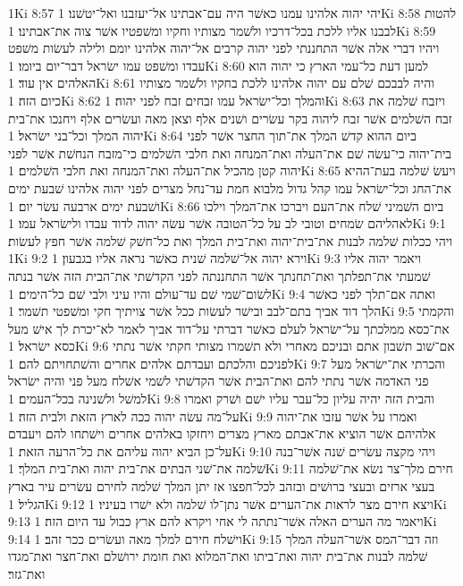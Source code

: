1Ki 8:57  יהי יהוה אלהינו עמנו כאשׁר היה עם־אבתינו אל־יעזבנו ואל־יטשׁנו׃
1Ki 8:58  להטות לבבנו אליו ללכת בכל־דרכיו ולשׁמר מצותיו וחקיו ומשׁפטיו אשׁר צוה את־אבתינו׃
1Ki 8:59  ויהיו דברי אלה אשׁר התחננתי לפני יהוה קרבים אל־יהוה אלהינו יומם ולילה לעשׂות משׁפט עבדו ומשׁפט עמו ישׂראל דבר־יום ביומו׃
1Ki 8:60  למען דעת כל־עמי הארץ כי יהוה הוא האלהים אין עוד׃
1Ki 8:61  והיה לבבכם שׁלם עם יהוה אלהינו ללכת בחקיו ולשׁמר מצותיו כיום הזה׃
1Ki 8:62  והמלך וכל־ישׂראל עמו זבחים זבח לפני יהוה׃
1Ki 8:63  ויזבח שׁלמה את זבח השׁלמים אשׁר זבח ליהוה בקר עשׂרים ושׁנים אלף וצאן מאה ועשׂרים אלף ויחנכו את־בית יהוה המלך וכל־בני ישׂראל׃
1Ki 8:64  ביום ההוא קדשׁ המלך את־תוך החצר אשׁר לפני בית־יהוה כי־עשׂה שׁם את־העלה ואת־המנחה ואת חלבי השׁלמים כי־מזבח הנחשׁת אשׁר לפני יהוה קטן מהכיל את־העלה ואת־המנחה ואת חלבי השׁלמים׃
1Ki 8:65  ויעשׂ שׁלמה בעת־ההיא את־החג וכל־ישׂראל עמו קהל גדול מלבוא חמת עד־נחל מצרים לפני יהוה אלהינו שׁבעת ימים ושׁבעת ימים ארבעה עשׂר יום׃
1Ki 8:66  ביום השׁמיני שׁלח את־העם ויברכו את־המלך וילכו לאהליהם שׂמחים וטובי לב על כל־הטובה אשׁר עשׂה יהוה לדוד עבדו ולישׂראל עמו׃
1Ki 9:1  ויהי ככלות שׁלמה לבנות את־בית־יהוה ואת־בית המלך ואת כל־חשׁק שׁלמה אשׁר חפץ לעשׂות׃
1Ki 9:2  וירא יהוה אל־שׁלמה שׁנית כאשׁר נראה אליו בגבעון׃
1Ki 9:3  ויאמר יהוה אליו שׁמעתי את־תפלתך ואת־תחנתך אשׁר התחננתה לפני הקדשׁתי את־הבית הזה אשׁר בנתה לשׂום־שׁמי שׁם עד־עולם והיו עיני ולבי שׁם כל־הימים׃
1Ki 9:4  ואתה אם־תלך לפני כאשׁר הלך דוד אביך בתם־לבב ובישׁר לעשׂות ככל אשׁר צויתיך חקי ומשׁפטי תשׁמר׃
1Ki 9:5  והקמתי את־כסא ממלכתך על־ישׂראל לעלם כאשׁר דברתי על־דוד אביך לאמר לא־יכרת לך אישׁ מעל כסא ישׂראל׃
1Ki 9:6  אם־שׁוב תשׁבון אתם ובניכם מאחרי ולא תשׁמרו מצותי חקתי אשׁר נתתי לפניכם והלכתם ועבדתם אלהים אחרים והשׁתחויתם להם׃
1Ki 9:7  והכרתי את־ישׂראל מעל פני האדמה אשׁר נתתי להם ואת־הבית אשׁר הקדשׁתי לשׁמי אשׁלח מעל פני והיה ישׂראל למשׁל ולשׁנינה בכל־העמים׃
1Ki 9:8  והבית הזה יהיה עליון כל־עבר עליו ישׁם ושׁרק ואמרו על־מה עשׂה יהוה ככה לארץ הזאת ולבית הזה׃
1Ki 9:9  ואמרו על אשׁר עזבו את־יהוה אלהיהם אשׁר הוציא את־אבתם מארץ מצרים ויחזקו באלהים אחרים וישׁתחו להם ויעבדם על־כן הביא יהוה עליהם את כל־הרעה הזאת׃
1Ki 9:10  ויהי מקצה עשׂרים שׁנה אשׁר־בנה שׁלמה את־שׁני הבתים את־בית יהוה ואת־בית המלך׃
1Ki 9:11  חירם מלך־צר נשׂא את־שׁלמה בעצי ארזים ובעצי ברושׁים ובזהב לכל־חפצו אז יתן המלך שׁלמה לחירם עשׂרים עיר בארץ הגליל׃
1Ki 9:12  ויצא חירם מצר לראות את־הערים אשׁר נתן־לו שׁלמה ולא ישׁרו בעיניו׃
1Ki 9:13  ויאמר מה הערים האלה אשׁר־נתתה לי אחי ויקרא להם ארץ כבול עד היום הזה׃
1Ki 9:14  וישׁלח חירם למלך מאה ועשׂרים ככר זהב׃
1Ki 9:15  וזה דבר־המס אשׁר־העלה המלך שׁלמה לבנות את־בית יהוה ואת־ביתו ואת־המלוא ואת חומת ירושׁלם ואת־חצר ואת־מגדו ואת־גזר׃
